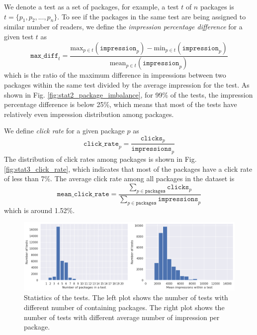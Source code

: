 \documentclass[%
preprint,
 amsmath,amssymb,
 aps,
]{revtex4-2}
\begin{document}
We denote a test as a set of packages, for example, a test \(t\) of \(n\) packages is \(t = \{p_1, p_2, ..., p_n\}\).
To see if the packages in the same test are being assigned to similar number of readers, we define the \textit{impression percentage difference} for a given test \(t\) as
\begin{equation}
   \texttt{max\_diff}_{t} = \frac{\mathrm{max}_{p\in t}(\texttt{impression}_p) - \mathrm{min}_{p\in t}(\texttt{impression}_p)}{\mathrm{mean}_{p\in t}(\texttt{impression}_p)}  
\end{equation}
which is the ratio of the maximum difference in impressions between two packages within the same test divided by the average impression for the test.
As shown in Fig. \ref{fig:stat2_package_imbalance}, for 99\% of the tests, the impression percentage difference is below 25\%, which means that most of the tests have relatively even impression distribution among packages.

We define \textit{click rate} for a given package \(p\) as
\begin{equation}
\label{eqn:click_rate}
    \texttt{click\_rate}_p = \frac{\texttt{clicks}_p}{\texttt{impressions}_p}    
\end{equation}
The distribution of click rates among packages is shown in Fig. \ref{fig:stat3_click_rate}, which indicates that most of the packages have a click rate of less than 7\%.
The average click rate among all packages in the dataset is
\begin{equation}
    \texttt{mean\_click\_rate} = \frac{\sum_{p\in\texttt{packages}} \texttt{clicks}_p}{\sum_{p\in\texttt{packages}} \texttt{impressions}_p}
\end{equation}
which is around 1.52\%.

\begin{figure}
    \centering
    \includegraphics[width=\linewidth]{fig/stat1_test_size.png}
    \caption{Statistics of the tests. The left plot shows the number of tests with different number of containing packages. The right plot shows the number of tests with different average number of impression per package.}
    \label{fig:stat1_test_size}
\end{figure}
\end{document}
